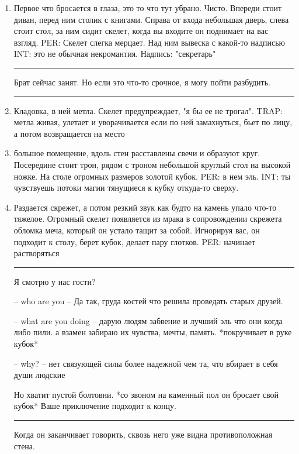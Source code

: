 \documentclass[a5paper,11pt]{book}
\newenvironment{boxed}
{\em\noindent\rule[1ex]{\linewidth}{0.1pt}\linebreak\indent}
{\par\noindent\rule[1ex]{\linewidth}{0.1pt}}
\begin{document}
\begin{multicols}{2}
\begin{enumerate}
\item Первое что бросается в глаза, это то что тут убрано. Чисто. Впереди стоит диван, перед ним столик с книгами. Справа от входа небольшая дверь, слева стоит стол, за ним сидит скелет, когда вы входите он поднимает на вас взгляд. PER: Скелет слегка мерцает. Над ним вывеска с какой-то надписью INT: это не обычная некромантия. Надпись: "секретарь"

\begin{boxed}
Брат сейчас занят. Но если это что-то срочное, я могу пойти разбудить.
\end{boxed}

\item Кладовка, в ней метла. Скелет предупреждает, "я бы ее не трогал". TRAP: метла живая, улетает и уворачивается если по ней замахнуться, бьет по лицу, а потом возвращается на место
\item большое помещение, вдоль стен расставлены свечи и образуют круг. Посередине стоит трон, рядом с троном небольшой круглый стол на высокой ножке. На столе огромных размеров золотой кубок. PER: в нем эль. INT: ты чувствуешь потоки магии тянущиеся к кубку откуда-то сверху.
\item Раздается скрежет, а потом резкий звук как будто на камень упало что-то тяжелое. Огромный скелет появляется из мрака в сопровождении скрежета обломка меча, который он устало тащит за собой. Игнорируя вас, он подходит к столу, берет кубок, делает пару глотков. PER: начинает растворяться

\begin{boxed}
Я смотрю у нас гости?

-- who are you -- Да так, груда костей что решила проведать старых друзей. 

-- what are you doing -- дарую людям забвение и лучший эль что они когда либо пили. а взамен забираю их чувства, мечты, память. *покручивает в руке кубок*

-- why? -- нет связующей силы более надежной чем та, что вбирает в себя души людские

Но хватит пустой болтовни. *со звоном на каменный пол он бросает свой кубок* Ваше приключение подходит к концу.
\end{boxed}

Когда он заканчивает говорить, сквозь него уже видна противоположная стена.

\end{enumerate}











\end{multicols}
\end{document}
